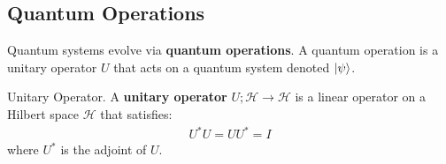 \subsection{Quantum Operations}

Quantum systems evolve via \textbf{quantum operations}. A quantum operation is a unitary operator $U$ that acts on a quantum system denoted $\ket{\psi}$.

\begin{definition}{Unitary Operator.}
    A \textbf{unitary operator} $U;\mathcal{H} \to \mathcal{H}$ is a linear operator on a Hilbert space $\mathcal{H}$ that satisfies:
    \begin{align}
        U^*U = UU^* = I
    \end{align}
    where $U^*$ is the adjoint of $U$.
\end{definition}

